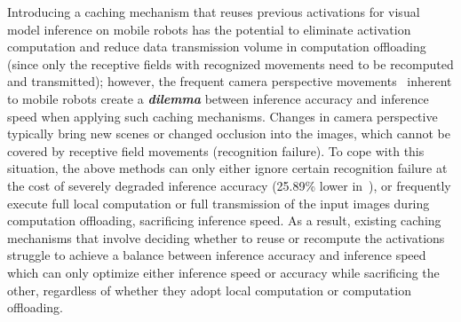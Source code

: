 Introducing a caching mechanism that reuses previous activations for visual model inference on mobile robots has the potential to eliminate activation computation and reduce data transmission volume in computation offloading (since only the receptive fields with recognized movements need to be recomputed and transmitted);
however, the frequent camera perspective movements~\cite{cavigelli_cbinfer_2017,huynh_deepmon_2017} inherent to mobile robots create a \textbf{\textit{dilemma}} between inference accuracy and inference speed when applying such caching mechanisms.
Changes in camera perspective typically bring new scenes or changed occlusion into the images, which cannot be covered by receptive field movements (recognition failure).
To cope with this situation, the above methods can only either ignore certain recognition failure at the cost of severely degraded inference accuracy (25.89\% lower in~\cite{huynh_deepmon_2017}), or frequently execute full local computation or full transmission of the input images during computation offloading, sacrificing inference speed.
As a result, existing caching mechanisms that involve deciding whether to reuse or recompute the activations struggle to achieve a balance between inference accuracy and inference speed which can only optimize either inference speed or accuracy while sacrificing the other, regardless of whether they adopt local computation or computation offloading.

